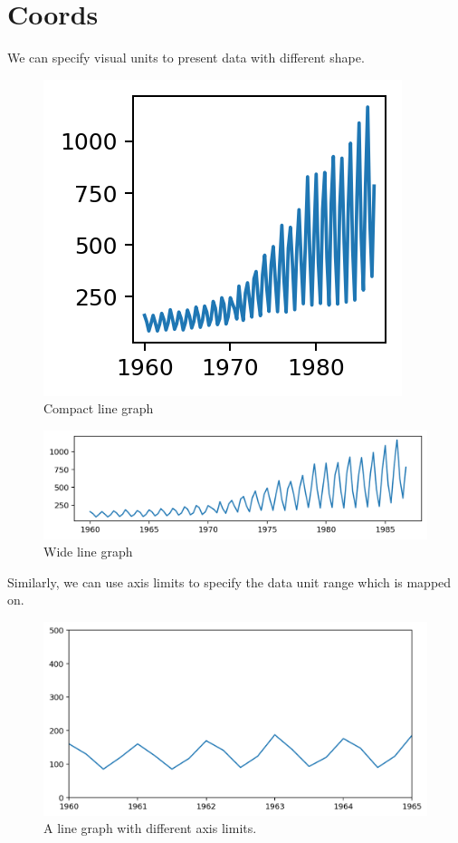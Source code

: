 \documentclass[a4paper, openany]{memoir}
\begin{document}
\section{Coords}
We can specify visual units to present data with different shape. 
\begin{figure}[H]
    \centering
    \includegraphics[scale=0.5]{src/2.53 compact line graph.png}
    \caption{Compact line graph}
\end{figure}
\begin{figure}[H]
    \centering
    \includegraphics[scale=0.5]{src/2.54 wide line graph.png}
    \caption{Wide line graph}
\end{figure}
\noindent Similarly, we can use axis limits to specify the data unit range which is mapped on. 
\begin{figure}[H]
    \centering
    \includegraphics[scale=0.5]{src/2.55 axis limits.png}
    \caption{A line graph with different axis limits.}    
\end{figure}
\end{document}
